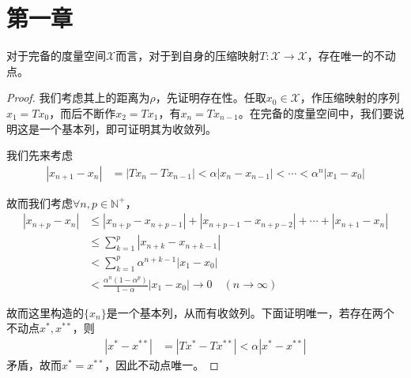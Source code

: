	\section{第一章}
	\begin{theorem}[Banach压缩映像原理]
		对于完备的度量空间$\mathscr{X}$而言，对于到自身的压缩映射$T:\mathscr{X}\to\mathscr{X}$，存在唯一的不动点。
	\end{theorem}
	\begin{proof}
		我们考虑其上的距离为$\rho$，先证明存在性。任取$x_0\in\mathscr{X}$，作压缩映射的序列$x_1 = Tx_0$，而后不断作$x_2 = Tx_1$，有$x_n = Tx_{n-1}$。在完备的度量空间中，我们要说明这是一个基本列，即可证明其为收敛列。
		
		我们先来考虑
		\begin{align*}
			|x_{n+1} - x_{n}| &= |Tx_{n} - Tx_{n-1}| < \alpha |x_{n} - x_{n-1}| < \cdots < \alpha^{n} |x_1 - x_0| 
		\end{align*}
		
		故而我们考虑$\forall n,p\in\mathbb{N}^+$，
		\begin{align*}
			|x_{n+p} - x_n| &\leqslant |x_{n+p} - x_{n+p-1}| + |x_{n+p-1} - x_{n+p-2}| + \cdots + |x_{n+1} - x_n| \\
			& \leqslant \sum\limits_{k=1}^{p} |x_{n+k} - x_{n+k-1}| \\
			& < \sum\limits_{k=1}^{p} \alpha^{n+k-1} |x_{1} - x_{0}| \\
			& < \frac{\alpha^n(1-\alpha^p)}{1-\alpha} |x_1 - x_0| \to 0\quad (n\to\infty)
		\end{align*}
		
		故而这里构造的$\{x_n\}$是一个基本列，从而有收敛列。下面证明唯一，若存在两个不动点$x^*,x^{**}$，则
		\begin{align*}
			|x^* - x^{**}| & = |Tx^* - Tx^{**}| < \alpha |x^* - x^{**}|
		\end{align*}
		矛盾，故而$x^* = x^{**}$，因此不动点唯一。
	\end{proof}
	

